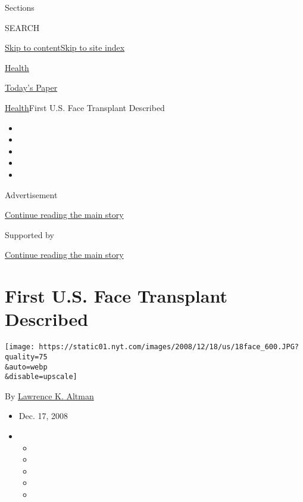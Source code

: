 Sections

SEARCH

\protect\hyperlink{site-content}{Skip to
content}\protect\hyperlink{site-index}{Skip to site index}

\href{https://www.nytimes.com/section/health}{Health}

\href{https://myaccount.nytimes.com/auth/login?response_type=cookie\&client_id=vi}{}

\href{https://www.nytimes.com/section/todayspaper}{Today's Paper}

\href{/section/health}{Health}\textbar{}First U.S. Face Transplant
Described

\begin{itemize}
\item
\item
\item
\item
\item
\end{itemize}

Advertisement

\protect\hyperlink{after-top}{Continue reading the main story}

Supported by

\protect\hyperlink{after-sponsor}{Continue reading the main story}

\hypertarget{first-us-face-transplant-described}{%
\section{First U.S. Face Transplant
Described}\label{first-us-face-transplant-described}}

\texttt{[image: https://static01.nyt.com/images/2008/12/18/us/18face\_600.JPG?quality=75\\\&auto=webp\\\&disable=upscale]}

By \href{https://www.nytimes.com/by/lawrence-k-altman}{Lawrence K.
Altman}

\begin{itemize}
\item
  Dec. 17, 2008
\item
  \begin{itemize}
  \item
  \item
  \item
  \item
  \item
  \end{itemize}
\end{itemize}

